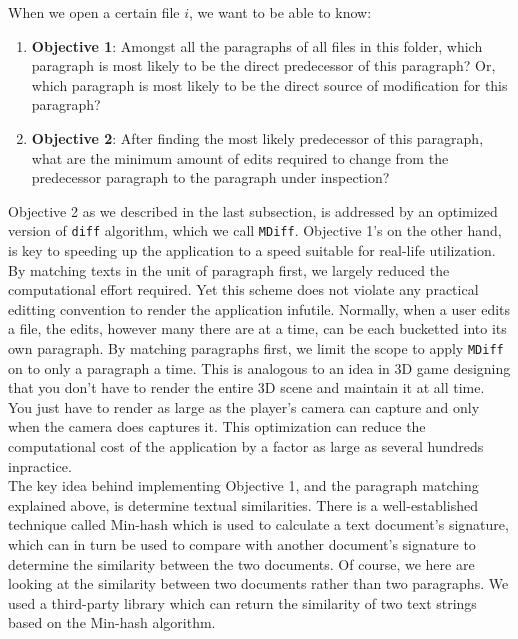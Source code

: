 \documentclass{article}
\begin{document}
When we open a certain file $i$, we want to be able to know:
\begin{enumerate}
  \item \textbf{Objective 1}: Amongst all the paragraphs of all files in this folder, which paragraph is most likely to be the direct predecessor of this paragraph? Or, which paragraph is most likely to be the direct source of modification for this paragraph?
  \item \textbf{Objective 2}: After finding the most likely predecessor of this paragraph, what are the minimum amount of edits required to change from the predecessor paragraph to the paragraph under inspection?
\end{enumerate}

Objective 2 as we described in the last subsection, is addressed by an optimized version of \texttt{diff} algorithm, which we call \texttt{MDiff}. Objective 1's on the other hand, is key to speeding up the application to a speed suitable for real-life utilization. \\

By matching texts in the unit of paragraph first, we largely reduced the computational effort required. Yet this scheme does not violate any practical editting convention to render the application infutile. Normally, when a user edits a file, the edits, however many there are at a time, can be each bucketted into its own paragraph. By matching paragraphs first, we limit the scope to apply \texttt{MDiff} on to only a paragraph a time.  This is analogous to an idea in 3D game designing that you don't have to render the entire 3D scene and maintain it at all time. You just have to render as large as the player's camera can capture and only when the camera does captures it. This optimization can reduce the computational cost of the application by a factor as large as several hundreds inpractice. \\

The key idea behind implementing Objective 1, and the paragraph matching explained above, is determine textual similarities. There is a well-established technique called Min-hash which is used to calculate a text document's signature, which can in turn be used to compare with another document's signature to determine the similarity between the two documents. Of course, we here are looking at the similarity between two documents rather than two paragraphs. We used a third-party library \cite{minhash} which can return the similarity of two text strings based on the Min-hash algorithm. \\
\end{document}
